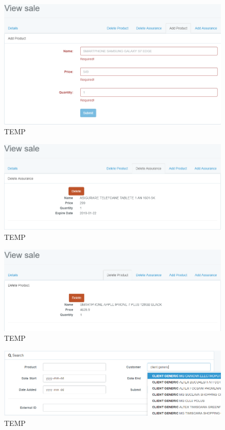 	\begin{figure}
		\includegraphics[width=\linewidth]{../imagini/sales_add_product.png}
		\caption{TEMP}
		\label{fig:TEMP}
	\end{figure}
	\begin{figure}
		\includegraphics[width=\linewidth]{../imagini/sales_delete_assurance.png}
		\caption{TEMP}
		\label{fig:TEMP}
	\end{figure}
	\begin{figure}
		\includegraphics[width=\linewidth]{../imagini/sales_delete_product.png}
		\caption{TEMP}
		\label{fig:TEMP}
	\end{figure}
	\begin{figure}
		\includegraphics[width=\linewidth]{../imagini/sales_search.png}
		\caption{TEMP}
		\label{fig:TEMP}
	\end{figure}
